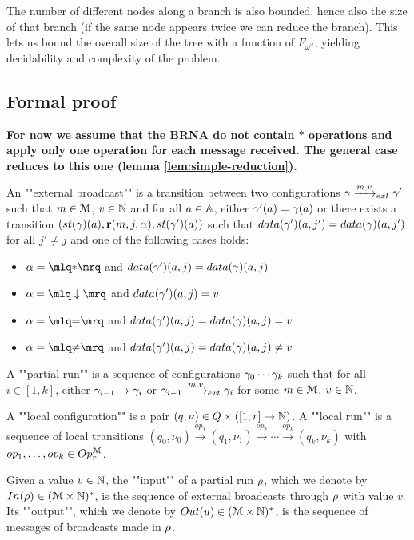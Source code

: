  The number of different nodes along a branch is also bounded, hence also the size of that branch (if the same node appears twice we can reduce the branch).
 This lets us bound the overall size of the tree with a function of $F_{\omega^\omega}$, yielding decidability and complexity of the problem.

\subsection{Formal proof}
\fi


\textbf{For now we assume that the BRNA do not contain $*$ operations and apply only one operation for each message received. The general case reduces to this one (lemma \ref{lem:simple-reduction}).}

\begin{definition}
	An ""external broadcast"" is a transition between two configurations $\gamma \xrightarrow{m, v}_{ext} \gamma'$ such that $m \in \mathcal{M}$, $v \in \mathbb{N}$ and for all $a \in \mathbb{A}$, either $\gamma'(a) = \gamma(a)$ or there exists a transition $(\st{\config}(a),\rec{m}{j}{\anact},\st{\config'}(a))$
	such that $\data{\config'}(a, j') = \data{\config}(a, j')$ for all $j' \neq j$ and one of the following cases holds:
		\begin{itemize}
			\item $\anact = \quotemarks{\dummyact}$ 
			and $\data{\config'}(a,j) = \data{\config}(a,j)$
			\item $\anact = \quotemarks{\enregact}$ and $\data{\config'}(a,j) = v$
			\item $\anact = \quotemarks{\eqtestact}$ and $\data{\config'}(a,j) = \data{\config}(a,j) =v$
			\item $\anact = \quotemarks{\diseqtestact}$ and $\data{\config'}(a,j) = \data{\config}(a,j) \ne v$
		\end{itemize}
		
		
	A ""partial run"" is a sequence of configurations $\gamma_0 \cdots \gamma_k$  such that for all $i \in [1, k]$, either $\gamma_{i-1} \xrightarrow{} \gamma_{i}$ or $\gamma_{i-1} \xrightarrow{m, v}_{ext} \gamma_{i}$ for some $m \in \mathcal{M}$, $v\in \mathbb{N}$. 
	
	A ""local configuration"" is a pair $(q, \nu) \in Q \times ([1,r] \to \mathbb{N})$.
	A ""local run"" is a sequence of local transitions $(q_0, \nu_0) \xrightarrow{op_1} (q_1, \nu_1) \xrightarrow{op_2} \cdots \xrightarrow{op_k} (q_k, \nu_k)$ with $op_1, \ldots, op_k \in Op_r^{\mathcal{M}}$. 
	
	Given a value $v \in \mathbb{N}$, the ""input"" of a partial run $\rho$, which we denote by $In(\rho) \in (\mathcal{M} \times \mathbb{N})^*$, is the sequence of external broadcasts through $\rho$ with value $v$.
	Its ""output"", which we denote by $Out(u) \in (\mathcal{M} \times \mathbb{N})^*$, is the sequence of messages of broadcasts made in $\rho$. 
	

\end{definition}
